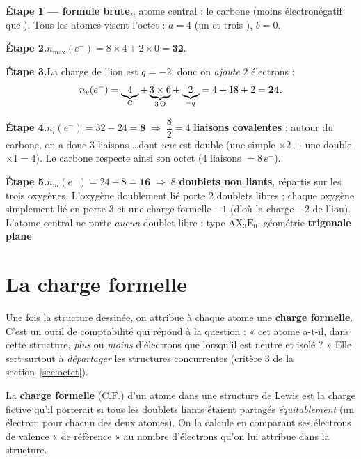 \documentclass[11pt,a4paper]{article}
\newcommand{\nmax}{n_{\max}(e^{-})}
\newcommand{\nv}{n_{v}(e^{-})}
\newcommand{\nl}{n_{l}(e^{-})}
\newcommand{\nnl}{n_{nl}(e^{-})}
\newcommand{\CF}{\ensuremath{\mathrm{C.F.}}}
\newcommand{\AX}[2]{\ensuremath{\mathrm{AX_{#1}E_{#2}}}}
\begin{document}
\begin{exemple}
\textbf{Étape 1 — formule brute.}\quad {}, atome central : le carbone  (moins
électronégatif que ). Tous les atomes visent l'octet : $a=4$ (un  et trois ),
$b=0$.

\smallskip
\textbf{Étape 2.}\quad $\nmax = 8\times 4 + 2\times 0 = \mathbf{32}.$

\smallskip
\textbf{Étape 3.}\quad La charge de l'ion est $q=-2$, donc on \emph{ajoute} $2$ électrons :
\[ \nv = \underbrace{4}_{\ce{C}} + \underbrace{3\times 6}_{3\,\ce{O}} + \underbrace{2}_{-q}
   = 4 + 18 + 2 = \mathbf{24}. \]

\smallskip
\textbf{Étape 4.}\quad $\nl = 32 - 24 = \mathbf{8}\;\Rightarrow\;\dfrac{8}{2}=4$ \textbf{liaisons
covalentes} : autour du carbone, on a donc $3$ liaisons \ldots dont \emph{une} est double
(une simple $\times 2$ + une double $\times 1 = 4$). Le carbone respecte ainsi son octet
($4$ liaisons $= 8\,e^-$).

\smallskip
\textbf{Étape 5.}\quad $\nnl = 24 - 8 = \mathbf{16}\;\Rightarrow\;8$ \textbf{doublets non liants},
répartis sur les trois oxygènes. L'oxygène doublement lié porte $2$ doublets libres ; chaque
oxygène simplement lié en porte $3$ et une charge formelle $-1$ (d'où la charge $-2$ de l'ion).
L'atome central  ne porte \emph{aucun} doublet libre : type \AX{3}{0}, géométrie
\textbf{trigonale plane}.
\end{exemple}

\section{La charge formelle}
\label{sec:cf}

Une fois la structure dessinée, on attribue à chaque atome une \textbf{charge formelle}. C'est un
outil de comptabilité qui répond à la question : « cet atome a-t-il, dans cette structure,
\emph{plus} ou \emph{moins} d'électrons que lorsqu'il est neutre et isolé ? » Elle sert surtout à
\emph{départager} les structures concurrentes (critère 3 de la section~\ref{sec:octet}).

\begin{definition}
La \textbf{charge formelle} (\CF) d'un atome dans une structure de Lewis est la charge fictive
qu'il porterait si tous les doublets liants étaient partagés \emph{équitablement} (un électron
pour chacun des deux atomes). On la calcule en comparant ses électrons de valence « de référence »
au nombre d'électrons qu'on lui attribue dans la structure.
\end{definition}
\end{document}
